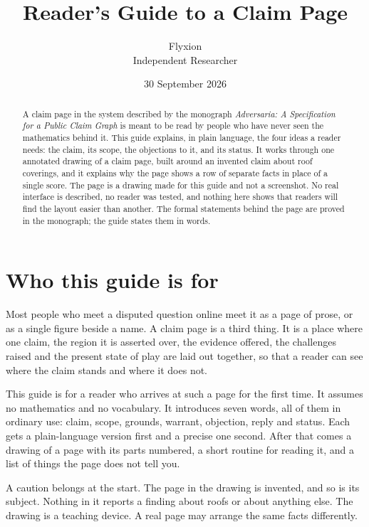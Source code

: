 \documentclass[11pt]{article}
\title{Reader's Guide to a Claim Page}
\author{Flyxion\\\small Independent Researcher}
\date{30 September 2026}
\begin{document}
\maketitle

\begin{abstract}
\noindent
A claim page in the system described by the monograph \emph{Adversaria: A Specification for a Public Claim Graph} is meant to be read by people who have never seen the mathematics behind it. This guide explains, in plain language, the four ideas a reader needs: the claim, its scope, the objections to it, and its status. It works through one annotated drawing of a claim page, built around an invented claim about roof coverings, and it explains why the page shows a row of separate facts in place of a single score. The page is a drawing made for this guide and not a screenshot. No real interface is described, no reader was tested, and nothing here shows that readers will find the layout easier than another. The formal statements behind the page are proved in the monograph; the guide states them in words.
\end{abstract}

\section{Who this guide is for}

Most people who meet a disputed question online meet it as a page of prose, or as a single figure beside a name. A claim page is a third thing. It is a place where one claim, the region it is asserted over, the evidence offered, the challenges raised and the present state of play are laid out together, so that a reader can see where the claim stands and where it does not.

This guide is for a reader who arrives at such a page for the first time. It assumes no mathematics and no vocabulary. It introduces seven words, all of them in ordinary use: claim, scope, grounds, warrant, objection, reply and status. Each gets a plain-language version first and a precise one second. After that comes a drawing of a page with its parts numbered, a short routine for reading it, and a list of things the page does not tell you.

A caution belongs at the start. The page in the drawing is invented, and so is its subject. Nothing in it reports a finding about roofs or about anything else. The drawing is a teaching device. A real page may arrange the same facts differently.
\end{document}
